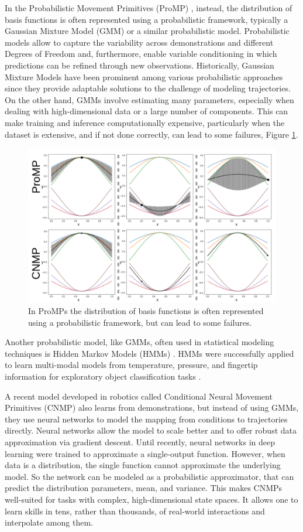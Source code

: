 In the Probabilistic Movement Primitives (ProMP) \cite{paraschos2013probabilistic}, instead, the distribution of basis functions is often represented using a probabilistic framework, typically a Gaussian Mixture Model (GMM) or a similar probabilistic model.  Probabilistic models allow to capture the variability across demonstrations and different Degrees of Freedom and, furthermore,  enable variable conditioning in which predictions can be refined through new observations.
Historically, Gaussian Mixture Models \cite{nguyen2009model} have been prominent among various probabilistic approaches since they provide adaptable solutions to the challenge of modeling trajectories. On the other hand, GMMs involve estimating many parameters, especially when dealing with high-dimensional data or a large number of components. This can make training and inference computationally expensive, particularly when the dataset is extensive, and if not done correctly, can lead to some failures, Figure \ref{fig:prompcnmp}.
\begin{figure}
	\centering
	\includegraphics[width=0.5\linewidth]{Images/ProMPvsCNMP.png}
	\caption{In ProMPs the distribution of basis functions is often represented using a probabilistic framework, but can lead to some failures.}
	\label{fig:prompcnmp}
\end{figure}

Another probabilistic model, like GMMs, often used in statistical modeling techniques is Hidden Markov Models (HMMs) \cite{lee2011incremental}. HMMs were successfully applied to learn multi-modal models from temperature, pressure, and fingertip information for exploratory object classification tasks \cite{chu2013using}.

A recent model developed in robotics called Conditional Neural Movement Primitives (CNMP) \cite{Ugur-RSS-19} also learns from demonstrations, but instead of using GMMs, they use neural networks to model the mapping from conditions to trajectories directly. Neural networks allow the model to scale better and to offer robust data approximation via gradient descent. Until recently, neural networks in deep learning were trained to approximate a single-output function. However, when data is a distribution, the single function cannot approximate the underlying model. So the network can be modeled as a probabilistic approximator, that can predict the distribution parameters, mean, and variance. This makes CNMPs well-suited for tasks with complex, high-dimensional state spaces. It allows one to learn skills in tens, rather than thousands, of real-world interactions and interpolate among them.

